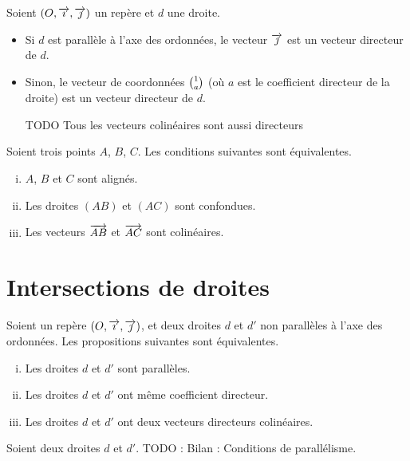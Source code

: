 \begin{propriete}
  Soient $(O, \overrightarrow{\imath}, \overrightarrow{\jmath})$ un repère et $d$ une droite.
  \begin{itemize}
    \item Si $d$ est parallèle à l'axe des ordonnées, le vecteur
      $\overrightarrow{\jmath}$ est un vecteur directeur de $d$.
    \item Sinon, le vecteur de coordonnées $\binom{1}{a}$ (où $a$ est le
      coefficient directeur de la droite) est un vecteur directeur de $d$.

      TODO Tous les vecteurs colinéaires sont aussi directeurs
  \end{itemize}
\end{propriete}

\begin{propriete}
  Soient trois points $A$, $B$, $C$. Les conditions suivantes sont équivalentes.
  \begin{enumerate}[(i)]
    \item $A$, $B$ et $C$ sont alignés.
    \item Les droites $(AB)$ et $(AC)$ sont confondues.
    \item Les vecteurs $\overrightarrow{AB}$ et $\overrightarrow{AC}$ sont colinéaires.
  \end{enumerate}
\end{propriete}

\section{Intersections de droites}

\begin{propriete}
  Soient un repère $(O, \overrightarrow{\imath}, \overrightarrow{\jmath})$, et deux droites $d$
  et $d'$ non parallèles à l'axe des ordonnées. Les propositions suivantes sont
  équivalentes.
  \begin{enumerate}[(i)]
    \item Les droites $d$ et $d'$ sont parallèles.
    \item Les droites $d$ et $d'$ ont même coefficient directeur.
    \item Les droites $d$ et $d'$ ont deux vecteurs directeurs colinéaires.
  \end{enumerate}
\end{propriete}

\begin{propriete}
  Soient deux droites $d$ et $d'$.
  TODO : Bilan : Conditions de parallélisme.
\end{propriete}

